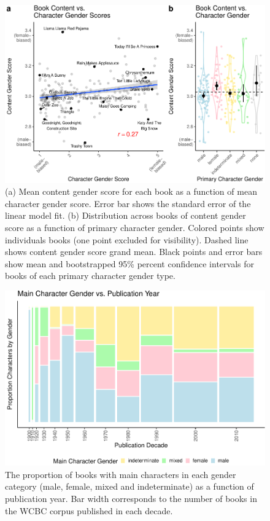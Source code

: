 \documentclass[
  english,
  ,man,floatsintext]{apa6}
\begin{document}
\begin{figure}[t!]
\includegraphics[width=\textwidth,]{figs/fig2.pdf} \caption{(a) Mean content gender score for each book as a function of mean character gender score. Error bar shows the standard error of the linear model fit.  (b) Distribution across books of content gender score as a function of primary character gender. Colored points show individuals books (one point excluded for visibility). Dashed line shows content gender score grand mean. Black points and error bars show mean and bootstrapped 95\% percent confidence intervals for books of each primary character gender type.}\label{fig:characterplot}
\end{figure}

\begin{figure}[t!]
\includegraphics{figs/fig3.pdf} \caption{The proportion of books with main characters in each gender category (male, female, mixed and indeterminate) as a function of publication year. Bar width corresponds to the number of books in the WCBC corpus published in each decade.}\label{fig:historicalplot}
\end{figure}
\end{document}
